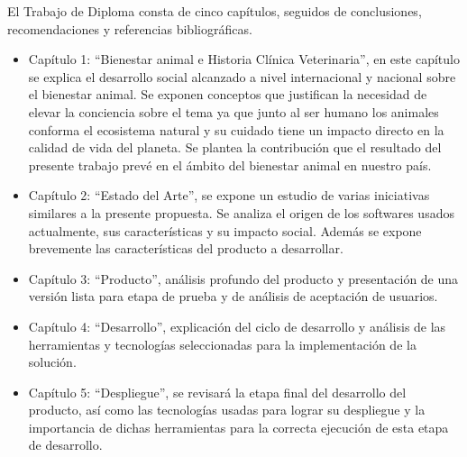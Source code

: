 El Trabajo de Diploma consta de cinco capítulos, seguidos de conclusiones, recomendaciones y referencias bibliográficas.
\begin{itemize}
\item Capítulo 1:  “Bienestar animal e Historia Clínica Veterinaria”, en este capítulo se explica el desarrollo social alcanzado a nivel internacional y nacional sobre el bienestar animal. Se exponen conceptos que justifican la necesidad de elevar la conciencia sobre el tema ya que junto al ser humano los animales conforma el ecosistema natural y su cuidado tiene un impacto directo en la calidad de vida del planeta. Se plantea la contribución que el resultado del presente trabajo prevé en el ámbito del bienestar animal en nuestro país. 

\item Capítulo 2: “Estado del Arte”, se expone un estudio de varias iniciativas similares a la presente propuesta. Se analiza el origen de los softwares usados actualmente, sus características y su impacto social. Además se expone brevemente las características del producto a desarrollar.

\item Capítulo 3: “Producto”, análisis profundo del producto y presentación de una versión lista para etapa de prueba y de análisis de aceptación de usuarios. 

\item Capítulo 4: “Desarrollo”, explicación del ciclo de desarrollo y análisis de las herramientas y tecnologías seleccionadas para la implementación de la solución.

\item Capítulo 5: “Despliegue”, se revisará la etapa final del desarrollo del producto, así como las tecnologías usadas para lograr su despliegue y la importancia de dichas herramientas para la correcta ejecución de esta etapa de desarrollo.

\end{itemize}
